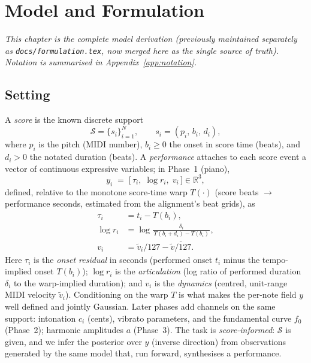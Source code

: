 \documentclass[11pt,a4paper]{report}
\newcommand{\R}{\mathbb{R}}
\newcommand{\score}{\mathcal{S}}
\begin{document}
\chapter{Model and Formulation}\label{ch:model}
\emph{This chapter is the complete model derivation (previously maintained
separately as \texttt{docs/formulation.tex}, now merged here as the single source
of truth). Notation is summarised in Appendix~\ref{app:notation}.}

\section{Setting}
A \emph{score} is the known discrete support
\begin{equation}
  \score = \{ s_i \}_{i=1}^{N}, \qquad s_i = (p_i,\, b_i,\, d_i),
  \label{eq:support}
\end{equation}
where $p_i$ is the pitch (MIDI number), $b_i \ge 0$ the onset in score time
(beats), and $d_i > 0$ the notated duration (beats). A \emph{performance} attaches
to each score event a vector of continuous expressive variables; in Phase~1
(piano),
\begin{equation}
  y_i \;=\; \bigl[\, \tau_i,\; \log r_i,\; v_i \,\bigr] \in \R^{3},
  \label{eq:variables}
\end{equation}
defined, relative to the monotone score-time warp $T(\cdot)$ (score beats $\to$
performance seconds, estimated from the alignment's beat grids), as
\begin{align}
  \tau_i   &= t_i - T(b_i), \label{eq:tau}\\
  \log r_i &= \log \frac{\delta_i}{\,T(b_i + d_i) - T(b_i)\,}, \label{eq:logr}\\
  v_i      &= \tilde v_i / 127 - \overline{\tilde v/127}. \label{eq:vel}
\end{align}
Here $\tau_i$ is the \emph{onset residual} in seconds (performed onset $t_i$ minus
the tempo-implied onset $T(b_i)$); $\log r_i$ is the \emph{articulation} (log ratio
of performed duration $\delta_i$ to the warp-implied duration); and $v_i$ is the
\emph{dynamics} (centred, unit-range MIDI velocity $\tilde v_i$). Conditioning on
the warp $T$ is what makes the per-note field $y$ well defined and jointly Gaussian.
Later phases add channels on
the same support: intonation $c_i$ (cents), vibrato parameters, and the fundamental
curve $f_0$ (Phase~2); harmonic amplitudes $a$ (Phase~3). The task is
\emph{score-informed}: $\score$ is given, and we infer the posterior over $y$
(inverse direction) from observations generated by the same model that, run
forward, synthesises a performance.
\end{document}

